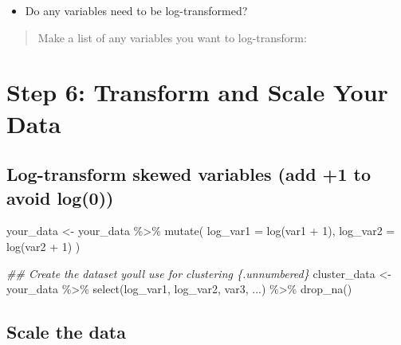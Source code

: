 \documentclass[
  11pt,
]{article}
\newenvironment{Shaded}{\begin{snugshade}}{\end{snugshade}}
\newcommand{\AttributeTok}[1]{\textcolor[rgb]{0.40,0.45,0.13}{#1}}
\newcommand{\DecValTok}[1]{\textcolor[rgb]{0.68,0.00,0.00}{#1}}
\newcommand{\DocumentationTok}[1]{\textcolor[rgb]{0.37,0.37,0.37}{\textit{#1}}}
\newcommand{\FunctionTok}[1]{\textcolor[rgb]{0.28,0.35,0.67}{#1}}
\newcommand{\NormalTok}[1]{\textcolor[rgb]{0.00,0.23,0.31}{#1}}
\newcommand{\OtherTok}[1]{\textcolor[rgb]{0.00,0.23,0.31}{#1}}
\newcommand{\SpecialCharTok}[1]{\textcolor[rgb]{0.37,0.37,0.37}{#1}}
\providecommand{\tightlist}{%
  \setlength{\itemsep}{0pt}\setlength{\parskip}{0pt}}\usepackage{longtable,booktabs,array}
\begin{document}
\begin{itemize}
\tightlist
\item
  Do any variables need to be log-transformed?
\end{itemize}

\vspace{2em}

\begin{quote}
Make a list of any variables you want to log-transform:
\end{quote}

\newpage

\section*{Step 6: Transform and Scale Your
Data}\label{step-6-transform-and-scale-your-data}

\subsection*{Log-transform skewed variables (add +1 to avoid
log(0))}\label{log-transform-skewed-variables-add-1-to-avoid-log0}

\begin{Shaded}
\begin{Highlighting}[]
\NormalTok{your\_data }\OtherTok{\textless{}{-}}\NormalTok{ your\_data }\SpecialCharTok{\%\textgreater{}\%}
  \FunctionTok{mutate}\NormalTok{(}
    \AttributeTok{log\_var1 =} \FunctionTok{log}\NormalTok{(var1 }\SpecialCharTok{+} \DecValTok{1}\NormalTok{),}
    \AttributeTok{log\_var2 =} \FunctionTok{log}\NormalTok{(var2 }\SpecialCharTok{+} \DecValTok{1}\NormalTok{)}
\NormalTok{  )}

\DocumentationTok{\#\# Create the dataset you\textquotesingle{}ll use for clustering \{.unnumbered\}}
\NormalTok{cluster\_data }\OtherTok{\textless{}{-}}\NormalTok{ your\_data }\SpecialCharTok{\%\textgreater{}\%}
  \FunctionTok{select}\NormalTok{(log\_var1, log\_var2, var3, ...) }\SpecialCharTok{\%\textgreater{}\%}
  \FunctionTok{drop\_na}\NormalTok{()}
\end{Highlighting}
\end{Shaded}

\subsection*{Scale the data}\label{scale-the-data}
\end{document}
